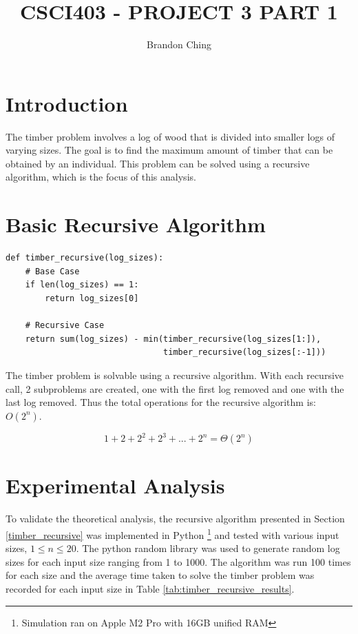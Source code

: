 \documentclass[12pt]{article}
\title{\uppercase{CSCI403 - Project 3 Part 1}}
\author{Brandon Ching}
\begin{document}
\section{Introduction}
The timber problem involves a log of wood that is divided into smaller logs of varying sizes. The goal is to find the maximum amount of timber that can be obtained by an individual. This problem can be solved using a recursive algorithm, which is the focus of this analysis.

\section{Basic Recursive Algorithm}
\begin{verbatim}
def timber_recursive(log_sizes):
    # Base Case
    if len(log_sizes) == 1:
        return log_sizes[0]

    # Recursive Case
    return sum(log_sizes) - min(timber_recursive(log_sizes[1:]),
                                timber_recursive(log_sizes[:-1]))
\end{verbatim}
\label{timber_recursive}

The timber problem is solvable using a recursive algorithm. With each recursive call, 2 subproblems are created, one with the first log removed and one with the last log removed. Thus the total operations for the recursive algorithm is: $O(2^n)$.

\begin{equation}
    1 + 2 + 2^2 + 2^3 + ... + 2^n = \Theta(2^n)
\end{equation}

\section{Experimental Analysis}
To validate the theoretical analysis, the recursive algorithm presented in Section \ref*{timber_recursive} was implemented in Python \footnote{Simulation ran on Apple M2 Pro with 16GB unified RAM} and tested with various input sizes, $1 \leq n \leq 20$. The python random library was used to generate random log sizes for each input size ranging from 1 to 1000. The algorithm was run 100 times for each size and the average time taken to solve the timber problem was recorded for each input size in Table \ref{tab:timber_recursive_results}.
\end{document}

